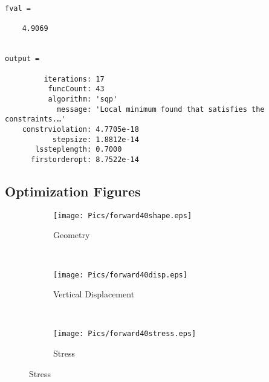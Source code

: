 \documentclass{article}
\begin{document}
\begin{lstlisting}[caption=Complex Step Output, label=complex40, float]
fval =

    4.9069


output = 

         iterations: 17
          funcCount: 43
          algorithm: 'sqp'
            message: 'Local minimum found that satisfies the constraints.…'
    constrviolation: 4.7705e-18
           stepsize: 1.8812e-14
       lssteplength: 0.7000
      firstorderopt: 8.7522e-14

\end{lstlisting}

\subsection{Optimization Figures}
\begin{figure}[H]
    \centering
    \caption{Forward Difference with 20 Nodes}
    \label{fig:forward40}
    \begin{subfigure}[b]{0.5\textwidth}
        \caption{Geometry}
        \texttt{[image: Pics/forward40shape.eps]}
        
    \end{subfigure}
    ~ %
    \begin{subfigure}[b]{0.5\textwidth}
        \caption{Vertical Displacement}
        \texttt{[image: Pics/forward40disp.eps]}
        
    \end{subfigure}
    ~ %
    \begin{subfigure}[b]{0.5\textwidth}
        \caption{Stress}
        \texttt{[image: Pics/forward40stress.eps]}
        
    \end{subfigure}
\end{figure}
\end{document}
